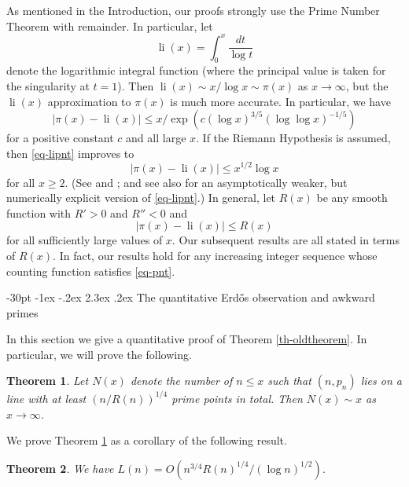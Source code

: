 \documentclass[10pt]{article}
\makeatletter
\renewcommand\section{\@startsection {section}{1}{\z@}
{-30pt \@plus -1ex \@minus -.2ex}
{2.3ex \@plus.2ex}
{\normalfont\normalsize\bfseries\boldmath}}
\newtheorem{theorem}{Theorem}
\theoremstyle{definition}
\theoremstyle{remark}
\numberwithin{equation}{section}
\DeclareMathOperator{\li}{li}
\makeatother
\begin{document}
As mentioned in the Introduction, our proofs strongly use the Prime Number Theorem with
remainder.  In particular, let
\[
\li(x)=\int_0^x\frac{dt}{\log t}
\]
denote the logarithmic integral function (where the principal value is taken for the singularity
at $t=1$).  Then $\li(x)\sim x/\log x\sim\pi(x)$ as $x\to\infty$, but the $\li(x)$ approximation
to $\pi(x)$ is much more accurate.  In particular, we have
\begin{equation}
\label{eq-lipnt}
|\pi(x)-\li(x)|\le x/\exp(c(\log x)^{3/5}(\log\log x)^{-1/5})
\end{equation}
for a positive constant $c$ and all large $x$.  If the Riemann Hypothesis is assumed, then
\eqref{eq-lipnt} improves to
\[
|\pi(x)-\li(x)|\le x^{1/2}\log x
\]
for all $x\ge2$. (See \cite{K} and \cite{MV}; and see also \cite{PT} for
an asymptotically weaker, but numerically explicit version of \eqref{eq-lipnt}.)
In general, let $R(x)$ be any smooth function with $R'>0$ and $R''<0$ and
\begin{equation}
\label{eq-pnt}
|\pi(x)-\li(x)|\le R(x)
\end{equation}
for all sufficiently large values of $x$.  Our subsequent results are all stated in
terms of $R(x)$.
In fact, our results hold for any increasing integer sequence
whose counting function satisfies \eqref{eq-pnt}.



\section{The quantitative Erd\H{o}s observation and awkward primes}\label{sec-L(n)}

In this section we give a quantitative proof of Theorem \ref{th-oldtheorem}.  In particular, we will prove the following.
\begin{theorem}
\label{th-newversion}
Let $N(x)$ denote the number of $n\le x$ such that
 $(n,p_n)$ lies on a line with at least
$(n/R(n))^{1/4}$  prime points in total. Then $N(x)\sim x$ as $x\to\infty$.
\end{theorem}
We prove Theorem \ref{th-newversion} as a corollary of the following result.
\begin{theorem}
\label{th-L(n)}
We have $L(n)=O(n^{3/4}R(n)^{1/4}/(\log n)^{1/2})$.
\end{theorem}
\end{document}
